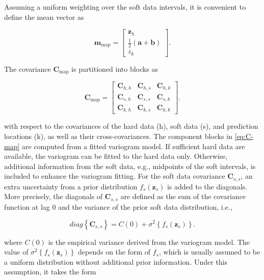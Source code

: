 Assuming a uniform weighting over the soft data intervals, it is convenient to define the mean vector as

\begin{equation}
\boldsymbol{m}_\mathrm{map} = \begin{bmatrix} \boldsymbol{z}_{h} \\ \frac{1}{2}(\boldsymbol{a} + \boldsymbol{b}) \\ z_k \end{bmatrix}
\label{eq:m-map}.
\end{equation}

The covariance \(\boldsymbol{C}_\mathrm{map}\) is partitioned into blocks as

\begin{equation}
\boldsymbol{C}_\mathrm{map} =
  \begin{bmatrix}
\boldsymbol{C}_{h,h} & \boldsymbol{C}_{h,s} & \boldsymbol{C}_{h,k} \\
\boldsymbol{C}_{s,h} & \boldsymbol{C}_{s,s} & \boldsymbol{C}_{s,k} \\
\boldsymbol{C}_{k,h} & \boldsymbol{C}_{k,s} & \boldsymbol{C}_{k,k} \end{bmatrix}
\label{eq:C-map}.
\end{equation}

with respect to the covariances of the hard data (h), soft data (s), and prediction locations (k), as well as their cross-covariances. The component blocks in \eqref{eq:C-map} are computed from a fitted variogram model. If sufficient hard data are available, the variogram can be fitted to the hard data only. Otherwise, additional information from the soft data, e.g., midpoints of the soft intervals, is included to enhance the variogram fitting. For the soft data covariance \(\boldsymbol{C}_{s,s}\), an extra uncertainty from a prior distribution \(f_s(\boldsymbol{z}_s)\) is added to the diagonals. More precisely, the diagonals of \(\boldsymbol{C}_{s,s}\) are defined as the sum of the covariance function at lag \(0\) and the variance of the prior soft data distribution, i.e.,

\begin{equation}
diag\left\{\boldsymbol{C}_{s,s}\right\}
= C(0) + \sigma^2\left\{f_s(\boldsymbol{z}_s)\right\}
\label{eq:var}.
\end{equation}

where \(C(0)\) is the empirical variance derived from the variogram model. The value of \(\sigma^2\left\{f_s(\boldsymbol{z}_s)\right\}\) depends on the form of \(f_s\), which is usually assumed to be a uniform distribution without additional prior information. Under this assumption, it takes the form

